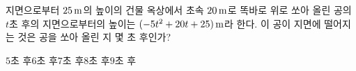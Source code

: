지면으로부터 $25\mkern3mu \mathrm{m}$의 높이의 건물 옥상에서 초속 $20\mkern3mu \mathrm{m}$로 똑바로 위로 쏘아 올린 공의 $t$초 후의 지면으로부터의 높이는 $(-5t^2+20t+25)\mkern3mu \mathrm{m}$라 한다. 이 공이 지면에 떨어지는 것은 공을 쏘아 올린 지 몇 초 후인가?
\begin{choices32}{$5$초 후}{$6$초 후}{$7$초 후}{$8$초 후}{$9$초 후}\end{choices32}
